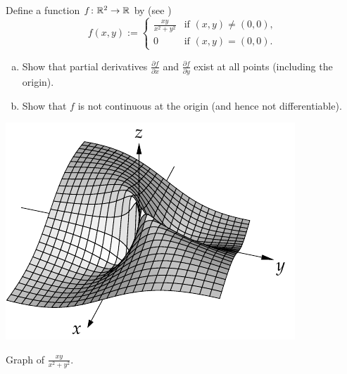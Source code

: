 \begin{exercise} \label{exercise:noncontpartialsexist}
Define a function $f \colon {\mathbb{R}}^2 \to {\mathbb{R}}$ by
(see )
\begin{equation*}
f(x,y)
:=
\begin{cases}
\frac{xy}{x^2+y^2} & \text{if } (x,y) \not= (0,0), \\
0                  & \text{if } (x,y) = (0,0).
\end{cases}
\end{equation*}
\begin{enumerate}[a)]
\item
Show that partial derivatives 
$\frac{\partial f}{\partial x}$ and
$\frac{\partial f}{\partial y}$ exist at all points (including the origin).
\item
Show that $f$ is not continuous at the origin (and hence not
differentiable).
\end{enumerate}
\end{exercise}

\begin{myfigureht}
\includegraphics{figures/xyxsqysq}
\caption{Graph of $\frac{xy}{x^2+y^2}$.\label{fig:xyxsqysqvol2}}
\end{myfigureht}

